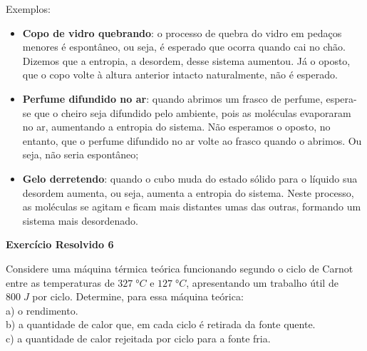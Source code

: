 \documentclass[12pt]{article}
\begin{document}
Exemplos:


\begin{itemize}

\item \textbf{Copo de vidro quebrando}: o processo de quebra do vidro em pedaços menores é espontâneo, ou seja, é esperado que ocorra quando cai no chão. Dizemos que a entropia, a desordem, desse sistema aumentou. Já o oposto, que o copo volte à altura anterior intacto naturalmente, não é esperado.

\item \textbf{Perfume difundido no ar}: quando abrimos um frasco de perfume, espera-se que o cheiro seja difundido pelo ambiente, pois as moléculas evaporaram no ar, aumentando a entropia do sistema. Não esperamos o oposto, no entanto, que o perfume difundido no ar volte ao frasco quando o abrimos. Ou seja, não seria espontâneo;

\item \textbf{Gelo derretendo}: quando o cubo muda do estado sólido para o líquido sua desordem aumenta, ou seja, aumenta a entropia do sistema. Neste processo, as moléculas se agitam e ficam mais distantes umas das outras, formando um sistema mais desordenado.

\end{itemize}


\textbf{Exercício Resolvido 6}


Considere uma máquina térmica teórica funcionando segundo o ciclo de Carnot entre as temperaturas de $327\;°C$ e $127\;°C$, apresentando um trabalho útil de $800\;J$ por ciclo. Determine, para essa máquina teórica: \\
a) o rendimento. \\
b) a quantidade de calor que, em cada ciclo é retirada da fonte quente. \\
c) a quantidade de calor rejeitada por ciclo para a fonte fria.
\end{document}
